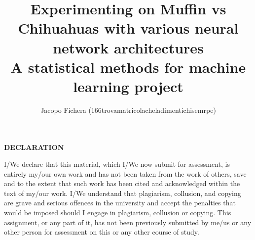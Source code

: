\documentclass[a4paper]{article}
\title{Experimenting on Muffin vs Chihuahuas with various neural network architectures \\
\large A statistical methods for machine learning project }
\author{Jacopo Fichera (166trovamatricolacheladimentichisemrpe)}
\begin{document}
    \maketitle

    \leavevmode%
    \vfill\noindent
    \begin{center}
        \textbf{DECLARATION}
    \end{center}
    I/We declare that this material, which I/We now submit for assessment, is entirely my/our own work and has not been taken from the work of others, save and to the extent that such work has been cited and acknowledged within the text of my/our work. I/We understand that plagiarism, collusion, and copying are grave and serious offences in the university and accept the penalties that would be imposed should I engage in plagiarism, collusion or copying. This assignment, or any part of it, has not been previously submitted by me/us or any other person for assessment on this or any other course of study.
    \newpage

    \tableofcontents


    
    
    
    
    
    
    
    \newpage
    
\end{document}

